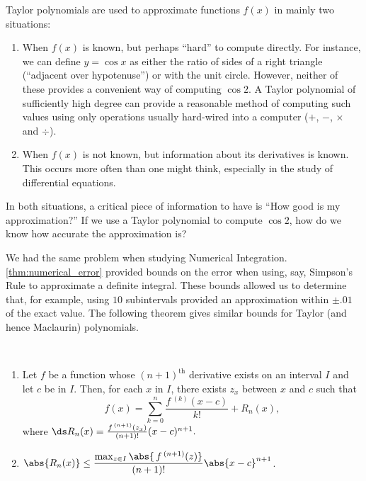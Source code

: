 Taylor polynomials are used to approximate functions $f(x)$ in mainly two situations:
\begin{enumerate}
	\item	When $f(x)$ is known, but perhaps ``hard'' to compute directly. For instance, we can define $y=\cos x$ as either the ratio of sides of a right triangle (``adjacent over hypotenuse'') or with the unit circle. However, neither of these provides a convenient way of computing $\cos 2$. A Taylor polynomial of sufficiently high degree can provide a reasonable method of computing such values using only operations usually hard-wired into a computer ($+$, $-$, $\times$ and $\div$).
	
	\item	When $f(x)$ is not known, but information about its derivatives is known. This occurs more often than one might think, especially in the study of differential equations.
\end{enumerate}

	
In both situations, a critical piece of information to have is ``How good is my approximation?'' If we use a Taylor polynomial to compute $\cos 2$, how do we know how accurate the approximation is? 

We had the same problem when studying Numerical Integration. \autoref{thm:numerical_error} provided bounds on the error when using, say, Simpson's Rule to approximate a definite integral. These bounds allowed us to determine that, for example, using $10$ subintervals provided an approximation within $\pm .01$ of the exact value. The following theorem gives similar bounds for Taylor (and hence Maclaurin) polynomials.

{\mbox{}\\[-2\baselineskip]
\begin{enumerate}
	\item	Let $f$ be a function whose $(n+1)^{\text{th}}$ derivative exists on an interval $I$ and let $c$ be in $I$. Then, for each $x$ in $I$, there exists $z_x$ between $x$ and $c$ such that
\[f(x) = \sum_{k=0}^n\frac{f\,^{(k)}(x-c)}{k!}+R_n(x),\]
where $\ds R_n(x) = \frac{f\,^{(n+1)}(z_x)}{(n+1)!}(x-c)^{n+1}.$
	\item	$\abs{R_n(x)}\leq\dfrac{\max_{z\in I}\abs{\,f\,^{(n+1)}(z)}}{(n+1)!}\abs{x-c}^{n+1}$.
\end{enumerate}}

